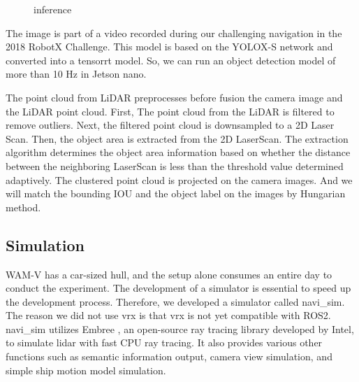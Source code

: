 \documentclass[lettersize,journal]{IEEEtran}
\begin{document}
\begin{figure}[H]
    \begin{center}
  \end{center}
  \caption{inference}
  \label{fig:inference}
\end{figure}

The image is part of a video recorded during our challenging navigation in the 2018 RobotX Challenge.\cite{RobotX2018_video}
This model is based on the YOLOX-S network and converted into a tensorrt model.
So, we can run an object detection model of more than 10 Hz in Jetson nano.

\indent The point cloud from LiDAR preprocesses before fusion the camera image and the LiDAR point cloud.
First, The point cloud from the LiDAR is filtered to remove outliers.
Next, the filtered point cloud is downsampled to a 2D Laser Scan.
Then, the object area is extracted from the 2D LaserScan. \cite{scan_segmentation}
The extraction algorithm determines the object area information based on whether the distance between 
the neighboring LaserScan is less than the threshold value determined adaptively.
The clustered point cloud is projected on the camera images.
And we will match the bounding IOU and the object label on the images by Hungarian method.

\subsection{Simulation}

WAM-V has a car-sized hull, and the setup alone consumes an entire day to conduct the experiment.
The development of a simulator is essential to speed up the development process.
Therefore, we developed a simulator called navi\_sim.
The reason we did not use vrx is that vrx is not yet compatible with ROS2.
navi\_sim utilizes Embree \cite{embree}, an open-source ray tracing library developed by Intel, to simulate lidar with fast CPU ray tracing.
It also provides various other functions such as semantic information output, camera view simulation, and simple ship motion model simulation.
\end{document}
